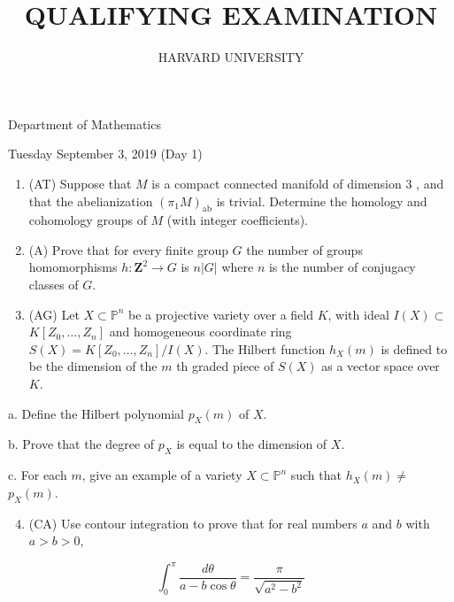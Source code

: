 \documentclass[10pt]{article}
\title{QUALIFYING EXAMINATION }
\author{HARVARD UNIVERSITY}
\date{}
\begin{document}
\maketitle
Department of Mathematics

Tuesday September 3, 2019 (Day 1)

\begin{enumerate}
  \item (AT) Suppose that $M$ is a compact connected manifold of dimension 3 , and that the abelianization $\left(\pi_{1} M\right)_{\mathrm{ab}}$ is trivial. Determine the homology and cohomology groups of $M$ (with integer coefficients).

  \item (A) Prove that for every finite group $G$ the number of groups homomorphisms $h: \mathbf{Z}^{2} \rightarrow G$ is $n|G|$ where $n$ is the number of conjugacy classes of $G$.

  \item (AG) Let $X \subset \mathbb{P}^{n}$ be a projective variety over a field $K$, with ideal $I(X) \subset$ $K\left[Z_{0}, \ldots, Z_{n}\right]$ and homogeneous coordinate ring $S(X)=K\left[Z_{0}, \ldots, Z_{n}\right] / I(X)$. The Hilbert function $h_{X}(m)$ is defined to be the dimension of the $m$ th graded piece of $S(X)$ as a vector space over $K$.

\end{enumerate}

a. Define the Hilbert polynomial $p_{X}(m)$ of $X$.

b. Prove that the degree of $p_{X}$ is equal to the dimension of $X$.

c. For each $m$, give an example of a variety $X \subset \mathbb{P}^{n}$ such that $h_{X}(m) \neq$ $p_{X}(m)$.

\begin{enumerate}
  \setcounter{enumi}{3}
  \item (CA) Use contour integration to prove that for real numbers $a$ and $b$ with $a>b>0$,
\end{enumerate}

$$
\int_{0}^{\pi} \frac{d \theta}{a-b \cos \theta}=\frac{\pi}{\sqrt{a^{2}-b^{2}}}
$$
\end{document}
